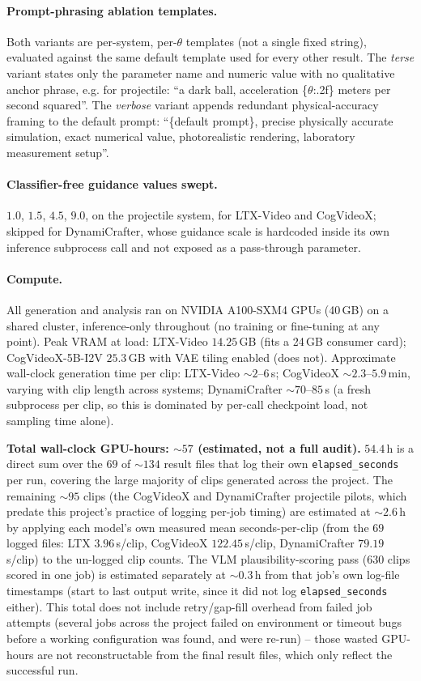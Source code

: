 \documentclass[10pt,twocolumn,letterpaper]{article}
\begin{document}
\paragraph{Prompt-phrasing ablation templates.} Both variants are
per-system, per-$\theta$ templates (not a single fixed string), evaluated
against the same default template used for every other result. The
\emph{terse} variant states only the parameter name and numeric value with
no qualitative anchor phrase, e.g. for projectile: ``a dark ball,
acceleration \{$\theta$:.2f\} meters per second squared''. The
\emph{verbose} variant appends redundant physical-accuracy framing to the
default prompt: ``\{default prompt\}, precise physically accurate
simulation, exact numerical value, photorealistic rendering, laboratory
measurement setup''.

\paragraph{Classifier-free guidance values swept.} $1.0$, $1.5$, $4.5$,
$9.0$, on the projectile system, for LTX-Video and CogVideoX; skipped for
DynamiCrafter, whose guidance scale is hardcoded inside its own inference
subprocess call and not exposed as a pass-through parameter.

\paragraph{Compute.} All generation and analysis ran on NVIDIA A100-SXM4
GPUs (40\,GB) on a shared cluster, inference-only throughout (no training
or fine-tuning at any point). Peak VRAM at load: LTX-Video $14.25$\,GB
(fits a 24\,GB consumer card); CogVideoX-5B-I2V $25.3$\,GB with VAE tiling
enabled (does not). Approximate wall-clock generation time per clip:
LTX-Video $\sim\!2$--$6$\,s; CogVideoX $\sim\!2.3$--$5.9$\,min, varying
with clip length across systems; DynamiCrafter $\sim\!70$--$85$\,s (a
fresh subprocess per clip, so this is dominated by per-call checkpoint
load, not sampling time alone).

\textbf{Total wall-clock GPU-hours: $\sim\!57$ (estimated, not a full
audit).} $54.4$\,h is a direct sum over the $69$ of $\sim\!134$ result
files that log their own \texttt{elapsed\_seconds} per run, covering the
large majority of clips generated across the project. The remaining
$\sim\!95$ clips (the CogVideoX and DynamiCrafter projectile pilots,
which predate this project's practice of logging per-job timing) are
estimated at $\sim\!2.6$\,h by applying each model's own measured
mean seconds-per-clip (from the $69$ logged files: LTX $3.96$\,s/clip,
CogVideoX $122.45$\,s/clip, DynamiCrafter $79.19$\,s/clip) to the
un-logged clip counts. The VLM plausibility-scoring pass ($630$ clips
scored in one job) is estimated separately at $\sim\!0.3$\,h from that
job's own log-file timestamps (start to last output write, since it did
not log \texttt{elapsed\_seconds} either). This total does not include
retry/gap-fill overhead from failed job attempts (several jobs across the
project failed on environment or timeout bugs before a working
configuration was found, and were re-run) -- those wasted GPU-hours are
not reconstructable from the final result files, which only reflect the
successful run.
\end{document}
